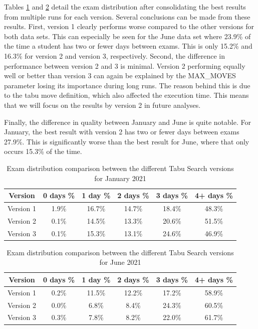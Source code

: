 Tables \ref{tab:version_comparison_sem1} and \ref{tab:version_comparison_sem2} detail the exam distribution after consolidating the best results from multiple runs for each version. Several conclusions can be made from these results. First, version 1 clearly performs worse compared to the other versions for both data sets. This can especially be seen for the June data set where 23.9\% of the time a student has two or fewer days between exams. This is only 15.2\% and 16.3\% for version 2 and version 3, respectively. Second, the difference in performance between version 2 and 3 is minimal. Version 2 performing equally well or better than version 3 can again be explained by the MAX\_MOVES parameter losing its importance during long runs. The reason behind this is due to the tabu move definition, which also affected the execution time. This means that we will focus on the results by version 2 in future analyses.

Finally, the difference in quality between January and June is quite notable. For January, the best result with version 2 has two or fewer days between exams 27.9\%. This is significantly worse than the best result for June, where that only occurs 15.3\% of the time.

\begin{table}[h]
	\caption{Exam distribution comparison between the different Tabu Search versions for January 2021}
	\label{tab:version_comparison_sem1}
	\centering
	\begin{tabular}{c c c c c c}
		\hline
  	\textbf{Version}	&
   \textbf{0 days \% } &
    \textbf{1 day \% } & 
    \textbf{2 days \% } &
    \textbf{3 days \% } & 
    \textbf{4+ days \%}\\ \hline
    Version 1 & 1.9\% & 16.7\% & 14.7\% & 18.4\% & 48.3\% \\
    Version 2 & 0.1\% & 14.5\% & 13.3\% & 20.6\% & 51.5\% \\
    Version 3 & 0.1\% & 15.3\% & 13.1\% & 24.6\% & 46.9\% \\
        \hline
	\end{tabular}
\end{table}

\begin{table}[h]
	\caption{Exam distribution comparison between the different Tabu Search versions for June 2021}
	\label{tab:version_comparison_sem2}
	\centering
	\begin{tabular}{c c c c c c}
		\hline
  	\textbf{Version}	&
   \textbf{0 days \% } &
    \textbf{1 day \% } & 
    \textbf{2 days \% } &
    \textbf{3 days \% } & 
    \textbf{4+ days \%}\\ \hline
    Version 1 & 0.2\% & 11.5\% & 12.2\% & 17.2\% & 58.9\% \\
    Version 2 & 0.0\% & 6.8\% & 8.4\% & 24.3\% & 60.5\% \\
    Version 3 & 0.3\% & 7.8\% & 8.2\% & 22.0\% & 61.7\% \\
        \hline
	\end{tabular}
\end{table}
 \label{subsec:versions}
